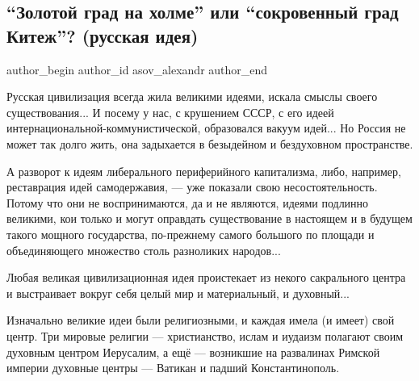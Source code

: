  
 
 
 
 
 
\subsection{\enquote{Золотой град на холме} или \enquote{сокровенный град Китеж}? (русская идея)}
\label{sec:07_11_2020.sites.ru.zen_yandex.asov_alexandr.1.russ_idea_kitezh}
\ifcmt
  author_begin
   author_id asov_alexandr
  author_end
\fi


Русская цивилизация всегда жила великими идеями, искала смыслы своего
существования... И посему у нас, с крушением СССР, с его идеей
интернациональной-коммунистической, образовался вакуум идей... Но Россия не
может так долго жить, она задыхается в безыдейном и бездуховном пространстве.

А разворот к идеям либерального периферийного капитализма, либо, например,
реставрация идей самодержавия, — уже показали свою несостоятельность. Потому
что они не воспринимаются, да и не являются, идеями подлинно великими, кои
только и могут оправдать существование в настоящем и в будущем такого мощного
государства, по-прежнему самого большого по площади и объединяющего множество
столь разноликих народов...

Любая великая цивилизационная идея проистекает из некого сакрального центра и
выстраивает вокруг себя целый мир и материальный, и духовный...

Изначально великие идеи были религиозными, и каждая имела (и имеет) свой центр.
Три мировые религии — христианство, ислам и иудаизм полагают своим духовным
центром Иерусалим, а ещё — возникшие на развалинах Римской империи духовные
центры — Ватикан и падший Константинополь. 

